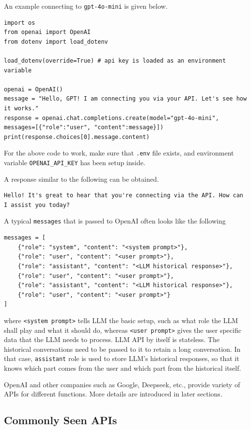 An example connecting to \verb|gpt-4o-mini| is given below.

\begin{lstlisting}
import os
from openai import OpenAI
from dotenv import load_dotenv

load_dotenv(override=True) # api key is loaded as an environment variable

openai = OpenAI()
message = "Hello, GPT! I am connecting you via your API. Let's see how it works."
response = openai.chat.completions.create(model="gpt-4o-mini", messages=[{"role":"user", "content":message}])
print(response.choices[0].message.content)
\end{lstlisting}

For the above code to work, make sure that \verb|.env| file exists, and environment variable \verb|OPENAI_API_KEY| has been setup inside.

A response similar to the following can be obtained.
\begin{lstlisting}
Hello! It's great to hear that you're connecting via the API. How can I assist you today?
\end{lstlisting}

A typical \verb|messages| that is passed to OpenAI often looks like the following
\begin{lstlisting}
messages = [
    {"role": "system", "content": "<system prompt>"},
    {"role": "user", "content": "<user prompt>"},
    {"role": "assistant", "content": "<LLM historical response>"},
    {"role": "user", "content": "<user prompt>"},
    {"role": "assistant", "content": "<LLM historical response>"},
    {"role": "user", "content": "<user prompt>"}
]
\end{lstlisting}
where \verb|<system prompt>| tells LLM the basic setup, such as what role the LLM shall play and what it should do, whereas \verb|<user prompt>| gives the user specific data that the LLM needs to process. LLM API by itself is stateless. The historical conversations need to be passed to it to retain a long conversation. In that case, \verb|assistant| role is used to store LLM's historical responses, so that it knows which part comes from the user and which part from the historical itself.

OpenAI and other companies such as Google, Deepseek, etc., provide variety of APIs for different functions. More details are introduced in later sections.

\subsection{Commonly Seen APIs}

